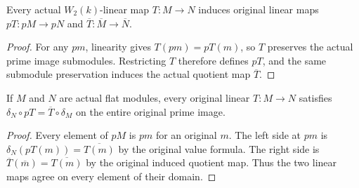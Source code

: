 \begin{definition}
\label{def:witt-two-module-prime-functoriality}
\leanok
{}
Every actual $W_2(k)$-linear map $T:M\to N$
induces original linear maps $pT:pM\to pN$
and $\overline T:\overline M\to\overline N$.
\end{definition}
\begin{proof}
For any $pm$, linearity gives $T(pm)=pT(m)$,
so $T$ preserves the actual prime image submodules.
Restricting $T$ therefore defines $pT$, and the
same submodule preservation induces the actual
quotient map $\overline T$.
\end{proof}

\begin{theorem}
\label{thm:witt-two-module-division-naturality}
\leanok
{}
If $M$ and $N$ are actual flat modules, every
original linear $T:M\to N$ satisfies
$\delta_N\circ pT=\overline T\circ\delta_M$
on the entire original prime image.
\end{theorem}
\begin{proof}
Every element of $pM$ is $pm$ for an original
$m$. The left side at $pm$ is
$\delta_N(pT(m))=\overline{T(m)}$ by the original
value formula. The right side is
$\overline T(\overline m)=\overline{T(m)}$ by
the original induced quotient map. Thus the two
linear maps agree on every element of their domain.
\end{proof}
